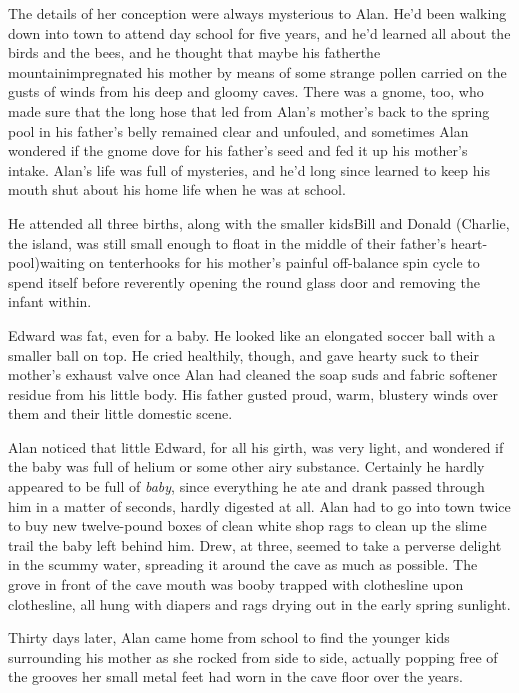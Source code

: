 The details of her conception were always mysterious to Alan.  He'd
been walking down into town to attend day school for five years, and
he'd learned all about the birds and the bees, and he thought that
maybe his father\dash{}the mountain\dash{}impregnated his mother by means of
some strange pollen carried on the gusts of winds from his deep and
gloomy caves.  There was a gnome, too, who made sure that the long
hose that led from Alan's mother's back to the spring pool in his
father's belly remained clear and unfouled, and sometimes Alan
wondered if the gnome dove for his father's seed and fed it up his
mother's intake.  Alan's life was full of mysteries, and he'd long
since learned to keep his mouth shut about his home life when he was
at school.

He attended all three births, along with the smaller kids\dash{}Bill and
Donald (Charlie, the island, was still small enough to float in the
middle of their father's heart-pool)\dash{}waiting on tenterhooks for his
mother's painful off-balance spin cycle to spend itself before
reverently opening the round glass door and removing the infant
within.

Edward was fat, even for a baby.  He looked like an elongated soccer
ball with a smaller ball on top.  He cried healthily, though, and gave
hearty suck to their mother's exhaust valve once Alan had cleaned the
soap suds and fabric softener residue from his little body.  His
father gusted proud, warm, blustery winds over them and their little
domestic scene.

Alan noticed that little Edward, for all his girth, was very light,
and wondered if the baby was full of helium or some other airy
substance.  Certainly he hardly appeared to be full of \textit{baby},
since everything he ate and drank passed through him in a matter of
seconds, hardly digested at all.  Alan had to go into town twice to
buy new twelve-pound boxes of clean white shop rags to clean up the
slime trail the baby left behind him.  Drew, at three, seemed to take
a perverse delight in the scummy water, spreading it around the cave
as much as possible.  The grove in front of the cave mouth was booby
trapped with clothesline upon clothesline, all hung with diapers and
rags drying out in the early spring sunlight.

Thirty days later, Alan came home from school to find the younger kids
surrounding his mother as she rocked from side to side, actually
popping free of the grooves her small metal feet had worn in the cave
floor over the years.


